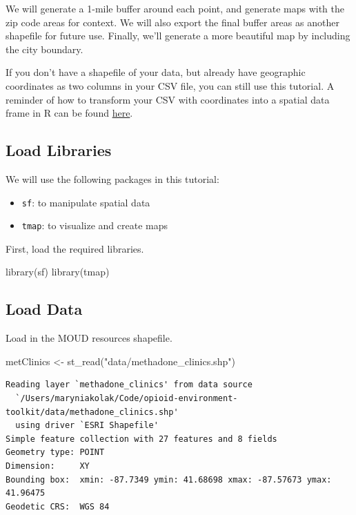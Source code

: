 \documentclass[
  letterpaper,
  DIV=11,
  numbers=noendperiod]{scrreprt}
\newenvironment{Shaded}{\begin{snugshade}}{\end{snugshade}}
\newcommand{\FunctionTok}[1]{\textcolor[rgb]{0.28,0.35,0.67}{#1}}
\newcommand{\NormalTok}[1]{\textcolor[rgb]{0.00,0.23,0.31}{#1}}
\newcommand{\OtherTok}[1]{\textcolor[rgb]{0.00,0.23,0.31}{#1}}
\newcommand{\StringTok}[1]{\textcolor[rgb]{0.13,0.47,0.30}{#1}}
\providecommand{\tightlist}{%
  \setlength{\itemsep}{0pt}\setlength{\parskip}{0pt}}
\begin{document}
We will generate a 1-mile buffer around each point, and generate maps
with the zip code areas for context. We will also export the final
buffer areas as another shapefile for future use. Finally, we'll
generate a more beautiful map by including the city boundary.

If you don't have a shapefile of your data, but already have geographic
coordinates as two columns in your CSV file, you can still use this
tutorial. A reminder of how to transform your CSV with coordinates into
a spatial data frame in R can be found
\href{http://geodacenter.github.io/opioid-environment-toolkit/geocodingAddress-tutorial.html\#GA-spatial-dataframe}{here}.

\subsection{Load Libraries}\label{BA-lib}

We will use the following packages in this tutorial:

\begin{itemize}
\tightlist
\item
  \texttt{sf}: to manipulate spatial data
\item
  \texttt{tmap}: to visualize and create maps
\end{itemize}

First, load the required libraries.

\begin{Shaded}
\begin{Highlighting}[]
\FunctionTok{library}\NormalTok{(sf)}
\FunctionTok{library}\NormalTok{(tmap)}
\end{Highlighting}
\end{Shaded}

\subsection{Load Data}\label{BA-data}

Load in the MOUD resources shapefile.

\begin{Shaded}
\begin{Highlighting}[]
\NormalTok{metClinics }\OtherTok{\textless{}{-}} \FunctionTok{st\_read}\NormalTok{(}\StringTok{"data/methadone\_clinics.shp"}\NormalTok{)}
\end{Highlighting}
\end{Shaded}

\begin{verbatim}
Reading layer `methadone_clinics' from data source 
  `/Users/maryniakolak/Code/opioid-environment-toolkit/data/methadone_clinics.shp' 
  using driver `ESRI Shapefile'
Simple feature collection with 27 features and 8 fields
Geometry type: POINT
Dimension:     XY
Bounding box:  xmin: -87.7349 ymin: 41.68698 xmax: -87.57673 ymax: 41.96475
Geodetic CRS:  WGS 84
\end{verbatim}
\end{document}
